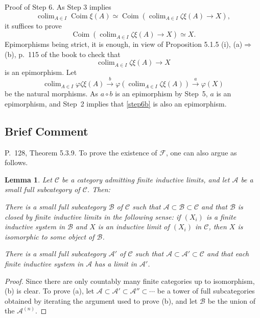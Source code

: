 \documentclass[12pt]{article}%
\newtheorem{lem}[thm]{Lemma}
\theoremstyle{remark}
\theoremstyle{definition}
\newcommand{\nn}{\noindent}
\newcommand{\A}{\mathcal A}
\newcommand{\B}{\mathcal B}
\newcommand{\C}{\mathcal C}
\newcommand{\F}{\mathcal F}
\newcommand{\pp}{\varphi}
\newcommand{\then}{\Rightarrow}
\DeclareMathOperator*{\colim}{colim}%
\DeclareMathOperator{\Coim}{Coim}
\begin{document}
\nn Proof of Step 6. As Step 3 implies 
$$
\colim_{A\in I}\Coim\xi(A)\simeq\Coim\left(\colim_{A\in I}\zeta\xi(A)\to X\right),
$$ 
it suffices to prove 
%
\begin{equation}\label{step6a}
\Coim\left(\colim_{A\in I}\zeta\xi(A)\to X\right)\simeq X.
\end{equation}
% 
Epimorphisms being strict, it is enough, in view of Proposition 5.1.5 (i), (a)$\then$(b), p.~115 of the book to check that 
%
\begin{equation}\label{step6b}
\colim_{A\in I}\zeta\xi(A)\to X
\end{equation}
% 
is an epimorphism. Let 
$$
\colim_{A\in I}\pp\zeta\xi(A)\xrightarrow{b}\pp\left(\colim_{A\in I}\zeta\xi(A)\right)\xrightarrow{a}\pp(X)
$$
be the natural morphisms. As $a\circ b$ is an epimorphism by Step~5, $a$ is an epimorphism, and Step~2 implies that \eqref{step6b} is also an epimorphism.


\subsection{Brief Comment}

P.~128, Theorem 5.3.9. To prove the existence of $\F$, one can also argue as follows. 

\begin{lem} 
Let $\C$ be a category admitting finite inductive limits, and let $\A$ be a small full subcategory of $\C$. Then:

\nn{\em(a)} There is a small full subcategory $\B$ of $\C$ such that $\A\subset\B\subset \C$ and that $\B$ is closed by finite inductive limits in the following sense: if $(X_i)$ is a finite inductive system in $\B$ and $X$ is an inductive limit of $(X_i)$ in $\C$, then $X$ is isomorphic to some object of $\B$.

\nn{\em(b)} There is a small full subcategory $\A'$ of $\C$ such that $\A\subset\A'\subset \C$ and that each finite inductive system in $\A$ has a limit in $\A'$. 
\end{lem} 

\begin{proof}
Since there are only countably many finite categories up to isomorphism, (b) is clear. To prove (a), let $\A\subset\A'\subset\A''\subset\cdots$ be a tower of full subcategories obtained by iterating the argument used to prove (b), and let $\B$ be the union of the $\A^{(n)}$.
\end{proof}
\end{document}

